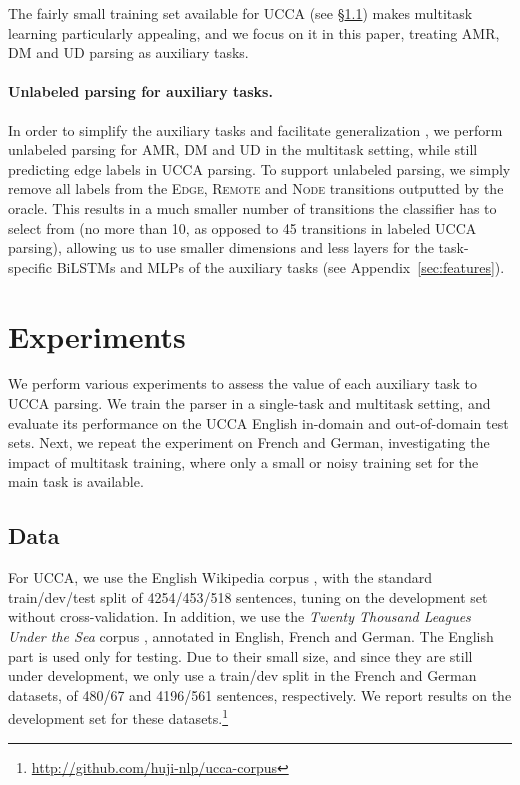 \documentclass[11pt,a4paper]{article}
\begin{document}
The fairly small training set available for UCCA (see \S\ref{sec:data})
makes multitask learning particularly appealing,
and we focus on it in this paper, treating AMR, DM and UD parsing as auxiliary tasks.

\paragraph{Unlabeled parsing for auxiliary tasks.}
In order to simplify the auxiliary tasks and facilitate generalization \cite{E17-2026},
we perform unlabeled parsing for AMR, DM and UD in the multitask setting,
while still predicting edge labels in UCCA parsing.
To support unlabeled parsing, we simply remove all labels from the
\textsc{Edge}, \textsc{Remote} and \textsc{Node} transitions outputted by the oracle.
This results in a much smaller number of transitions the classifier has to select from
(no more than 10, as opposed to 45 transitions in labeled UCCA parsing),
allowing us to use smaller dimensions and less layers for the task-specific BiLSTMs and MLPs
of the auxiliary tasks (see Appendix~\ref{sec:features}).



\section{Experiments}\label{sec:experiments}

We perform various experiments to assess the value of each auxiliary task to UCCA parsing.
We train the parser in a single-task and multitask setting,
and evaluate its performance on the UCCA English in-domain and out-of-domain test sets.
Next, we repeat the experiment on French and German, investigating the impact of multitask
training, where only a small or noisy training set for the main task is available.

\subsection{Data}\label{sec:data}

For UCCA, we use the English Wikipedia corpus \cite{abend2013universal},
with the standard train/dev/test split of 4254/453/518 sentences,
tuning on the development set without cross-validation.
In addition, we use
the \textit{Twenty Thousand Leagues Under the Sea} corpus \cite[20K leagues;][]{sulem2015conceptual},
annotated in English, French and German.
The English part is used only for testing.
Due to their small size, and since they are still under development, we only use a train/dev split
in the French and German datasets, of 480/67 and 4196/561 sentences, respectively.
We report results on the development set for these
datasets.\footnote{\mbox{\url{http://github.com/huji-nlp/ucca-corpus}}}
\end{document}
